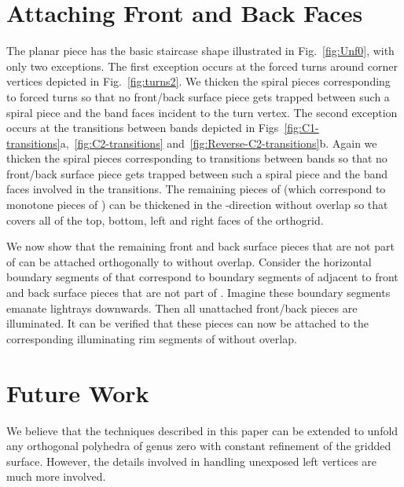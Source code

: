 \documentclass[11pt]{article}
\begin{document}
\section{Attaching Front and Back Faces}
\label{sec:frontback}
The planar piece  has the basic staircase shape illustrated in Fig.~\ref{fig:Unf0}, with only two exceptions.
The first exception occurs at the forced turns around corner vertices depicted in Fig.~\ref{fig:turns2}. We 
thicken the spiral pieces corresponding to forced turns so that no front/back surface piece gets trapped 
between such a spiral piece and the band faces incident to the turn  vertex. 
The second exception occurs at the transitions between bands depicted in 
Figs~\ref{fig:C1-transitions}a,~\ref{fig:C2-transitions} and~\ref{fig:Reverse-C2-transitions}b. Again we 
thicken the spiral pieces corresponding to transitions between bands so that no front/back surface piece 
gets trapped between such a spiral piece and the band faces involved in the transitions. 
The remaining  pieces of  (which correspond to monotone pieces of ) can be thickened in the -direction without overlap so that  covers all of the top, bottom, left and right faces of the orthogrid.


We now show that the remaining front and back surface pieces that are not part of  
can be attached orthogonally to  without overlap.
Consider the horizontal boundary segments of  that correspond to boundary segments of  adjacent to front and back surface pieces that are not part of .  Imagine these boundary segments emanate lightrays downwards. Then all unattached front/back pieces are illuminated. It can be verified that these pieces can now be attached to the corresponding illuminating rim segments of  without overlap. 

\section{Future Work}
We believe that the techniques described in this paper can be extended to unfold any orthogonal polyhedra of genus zero with constant refinement of the gridded surface. However, the details involved in handling unexposed left vertices are much more involved. 
\end{document}
